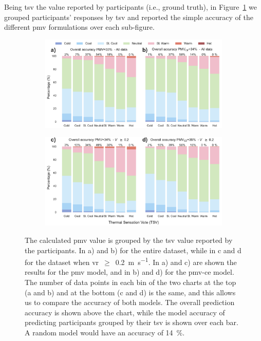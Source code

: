 Being \ac{tsv} the value reported by participants (i.e., ground truth), in Figure~\ref{fig:bar_stacked_model_accuracy} we grouped participants' responses by \ac{tsv} and reported the simple accuracy of the different \ac{pmv} formulations over each sub-figure.
\begin{figure}[htb!]
    \centering
    \begin{subfigure}[b]{\textwidth}
        \centering
        \includegraphics[width=\textwidth]{figures/bar_stacked_model_accuracy_0}
    \end{subfigure}
    \par\bigskip %
    \begin{subfigure}[b]{\textwidth}
        \centering
        \includegraphics[width=\textwidth]{figures/bar_stacked_model_accuracy_0.2}
    \end{subfigure}
    \caption{The calculated \ac{pmv} value is grouped by the \ac{tsv} value reported by the participants.
    In a) and b) for the entire dataset, while in c and d for the dataset when \ac{vr}~$\geq$~\qty{0.2}{\m\per\s}.
    In a) and c) are shown the results for the \ac{pmv} model, and in b) and d) for the \ac{pmv-ce} model.
    The number of data points in each bin of the two charts at the top (a and b) and at the bottom (c and d) is the same, and this allows us to compare the accuracy of both models.
    The overall prediction accuracy is shown above the chart, while the model accuracy of predicting participants grouped by their \ac{tsv} is shown over each bar.
    A random model would have an accuracy of \qty{14}{\percent}.}
    \label{fig:bar_stacked_model_accuracy}
\end{figure}
